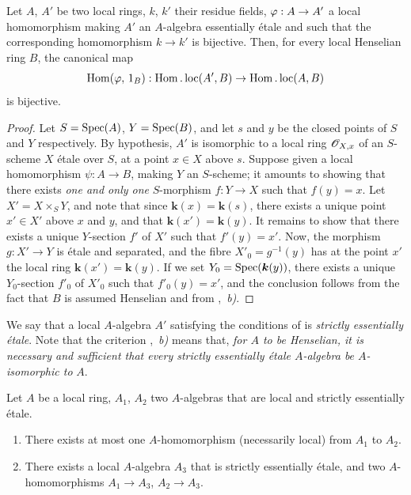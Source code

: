 \begin{lemma}[18.6.2]
\label{IV.18.6.2}
Let $A$, $A'$ be two local rings, $k$, $k'$ their residue fields,
$\varphi:A\to A'$ a local homomorphism making $A'$ an $A$-algebra essentially \'{e}tale 
and such that the corresponding homomorphism $k\to k'$ is bijective.
Then, for every local \textup{Henselian} ring $B$, the canonical map
\[
  \operatorname{Hom}(\varphi,\,1_{B}):\operatorname{Hom}.\operatorname{loc}(A',B)\to\operatorname{Hom}.\operatorname{loc}(A,B)
\]
is bijective.
\end{lemma}

\begin{proof}
Let $S=\operatorname{Spec}(A)$, $Y=\operatorname{Spec}(B)$, and let $s$ and $y$ be the closed points of $S$ and $Y$ respectively.
By hypothesis, $A'$ is isomorphic to a local ring $\mathscr{O}_{X,x}$ of an $S$-scheme $X$ \'{e}tale over $S$, at a point $x\in X$ above $s$.
Suppose given a local homomorphism $\psi:A\to B$, making $Y$ an $S$-scheme;
it amounts to showing that there exists \emph{one and only one} $S$-morphism $f:Y\to X$ such that $f(y)=x$.
Let $X'=X\times_{S}Y$, and note that since $\boldsymbol{k}(x)=\boldsymbol{k}(s)$, there exists a unique point $x'\in X'$ above $x$ and $y$, and that $\boldsymbol{k}(x')=\boldsymbol{k}(y)$.
It remains to show that there exists a unique $Y$-section $f'$ of $X'$ such that $f'(y)=x'$.
Now, the morphism $g:X'\to Y$ is \'{e}tale and separated, and the fibre $X'_0=g^{-1}(y)$ has at the point $x'$ the local ring $\boldsymbol{k}(x')=\boldsymbol{k}(y)$.
If we set $Y_0=\operatorname{Spec}(\boldsymbol{k}(y))$, there exists a unique $Y_0$-section $f'_0$ of $X'_0$ such that $f'_0(y)=x'$, and the conclusion follows from the fact that $B$ is assumed Henselian and from ,~\emph{b)}.
\end{proof}

We say that a local $A$-algebra $A'$ satisfying the conditions of  is \emph{strictly essentially \'{e}tale}.
Note that the criterion ,~\emph{b)} means that, \emph{for $A$ to be Henselian, it is necessary and sufficient that every strictly essentially \'{e}tale $A$-algebra be $A$-isomorphic to} $A$.

\begin{lemma}[18.6.3]
\label{IV.18.6.3}
Let $A$ be a local ring, $A_1$, $A_2$ two $A$-algebras that are local and strictly essentially \'{e}tale.
\begin{enumerate}[label=\emph{\roman*)}]
  \item There exists at most one $A$-homomorphism (necessarily local) from $A_1$ to $A_2$.
  \item There exists a local $A$-algebra $A_3$ that is strictly essentially \'{e}tale, and two $A$-homomorphisms $A_1\to A_3$, $A_2\to A_3$.
\end{enumerate}
\end{lemma}

